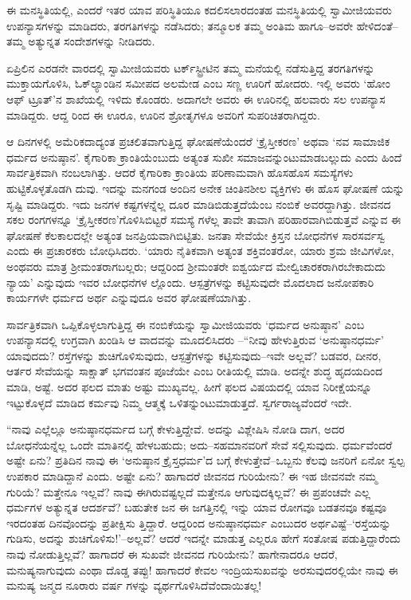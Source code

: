 ಈ ಮನಸ್ಥಿತಿಯಲ್ಲಿ, ಎಂದರೆ ಇತರ ಯಾವ ಪರಿಸ್ಥಿತಿಯೂ ಕದಲಿಸಲಾರದಂತಹ ಮನಸ್ಥಿತಿಯಲ್ಲಿ ಸ್ವಾಮೀಜಿಯವರು ಉಪನ್ಯಾಸಗಳನ್ನು ಮಾಡಿದರು, ತರಗತಿಗಳನ್ನು ನಡೆಸಿದರು; ತನ್ಮೂಲಕ ತಮ್ಮ ಅಂತಿಮ ಹಾಗೂ–ಅವರೇ ಹೇಳಿದಂತೆ–ತಮ್ಮ ಅತ್ಯುನ್ನತ ಸಂದೇಶಗಳನ್ನು ನೀಡಿದರು.

ಏಪ್ರಿಲಿನ ಎರಡನೇ ವಾರದಲ್ಲಿ ಸ್ವಾಮೀಜಿಯವರು ಟರ್ಕ್​ಸ್ಟ್ರೀಟಿನ ತಮ್ಮ ಮನೆಯಲ್ಲಿ ನಡೆಸುತ್ತಿದ್ದ ತರಗತಿಗಳನ್ನು ಮುಕ್ತಾಯಗೊಳಿಸಿ, ಓಕ್​ಲ್ಯಾಂಡಿನ ಸಮೀಪದ ಅಲಮೇಡ ಎಂಬ ಸಣ್ಣ ಊರಿಗೆ ಹೋದರು. ಇಲ್ಲಿ ಅವರು ‘ಹೋಂ ಆಫ್ ಟ್ರೂತ್​’ನ ಶಾಖೆಯಲ್ಲಿ ಇಳಿದು ಕೊಂಡರು. ಅದಾಗಲೇ ಅವರು ಈ ಊರಿನಲ್ಲಿ ಹಲವಾರು ಸಲ ಉಪನ್ಯಾಸ ಮಾಡಿದ್ದರು. ಆದ್ದ ರಿಂದ ಈ ಊರೂ, ಊರಿನ ಶ್ರೋತೃಗಳೂ ಅವರಿಗೆ ಸುಪರಿಚಿತರಾಗಿದ್ದರು.

ಆ ದಿನಗಳಲ್ಲಿ ಅಮೆರಿಕದಾದ್ಯಂತ ಪ್ರಚಲಿತವಾಗುತ್ತಿದ್ದ ಘೋಷಣೆಯೆಂದರೆ ‘ಕ್ರೈಸ್ತೀಕರಣ’ ಅಥವಾ ‘ನವ ಸಾಮಾಜಿಕ ಧರ್ಮದ ಅನುಷ್ಠಾನ’. ಕೈಗಾರಿಕಾ ಕ್ರಾಂತಿಯೆಂಬುದು ಅತ್ಯಂತ ಸುಖೀ ಸಮಾಜವನ್ನುಂಟುಮಾಡಬಲ್ಲುದು ಎಂದು ಹಿಂದೆ ಸಾರ್ವತ್ರಿಕವಾಗಿ ನಂಬಲಾಗಿತ್ತು. ಆದರೆ ಕೈಗಾರಿಕಾ ಕ್ರಾಂತಿಯ ಪರಿಣಾಮವಾಗಿ ಹೊಸಹೊಸ ಸಮಸ್ಯೆಗಳು ಹುಟ್ಟಿಕೊಳ್ಳತೊಡಗಿ ದುವು. ಇದನ್ನು ಮನಗಂಡ ಅಂದಿನ ಅನೇಕ ಚಿಂತಿನಶೀಲ ವ್ಯಕ್ತಿಗಳು ಈ ಹೊಸ ಘೋಷಣೆ ಯನ್ನು ಸೃಷ್ಟಿ ಮಾಡಿದ್ದರು. ಇದು ಜನಗಳ ಕಷ್ಟಗಳನ್ನೆಲ್ಲ ದೂರ ಮಾಡಿಬಿಡುತ್ತದೆಯೆಂಬ ನಂಬಿಕೆ ಅವರದ್ದಾಗಿತ್ತು. ಜೀವನದ ಸಕಲ ರಂಗಗಳನ್ನೂ ‘ಕ್ರೈಸ್ತೀಕರಣ’ಗೊಳಿಸಿಬಿಟ್ಟರೆ ಸಮಸ್ಯೆ ಗಳೆಲ್ಲ ತಾವೇ ತಾವಾಗಿ ಪರಿಹಾರವಾಗಿಬಿಡುತ್ತವೆ ಎನ್ನುವ ಈ ಘೋಷಣೆ ಕೆಲಕಾಲದಲ್ಲೇ ಅತ್ಯಂತ ಜನಪ್ರಿಯವಾಗಿಬಿಟ್ಟಿತು. ಜನತಾ ಸೇವೆಯೇ ಕ್ರಿಸ್ತನ ಬೋಧನೆಗಳ ಸಾರಸರ್ವಸ್ವ ಎಂದು ಈ ಪ್ರಚಾರಕರು ಬೋಧಿಸಿದರು. ‘ಯಾರು ನೈತಿಕವಾಗಿ ಅತ್ಯಂತ ಶಕ್ತಿವಂತರೋ, ಯಾರು ಶ್ರಮ ಜೀವಿಗಳೋ, ಅಂಥವರು ಮಾತ್ರ ಶ್ರೀಮಂತರಾಗಬಲ್ಲರು; ಆದ್ದರಿಂದ ಶ್ರೀಮಂತರೇ ಐಶ್ವರ್ಯದ ಮೇಲ್ವಿಚಾರಕರಾಗಿರಬೇಕಾದುದು ನ್ಯಾಯ’ ಎನ್ನುವುದು ಇವರ ಬೋಧನೆಗಳ ಲ್ಲೊಂದು. ಆಸ್ಪತ್ರೆಗಳನ್ನು ಕಟ್ಟಿಸುವುದೇ ಮೊದಲಾದ ಜನೋಪಕಾರಿ ಕಾರ್ಯಗಳೇ ಧರ್ಮದ ಅರ್ಥ ಎನ್ನುವುದೂ ಅವರ ಘೋಷಣೆಯಾಗಿತ್ತು.

ಸಾರ್ವತ್ರಿಕವಾಗಿ ಒಪ್ಪಿಕೊಳ್ಳಲಾಗುತ್ತಿದ್ದ ಈ ನಂಬಿಕೆಯನ್ನು ಸ್ವಾಮೀಜಿಯವರು ‘ಧರ್ಮದ ಅನುಷ್ಠಾನ’ ಎಂಬ ಉಪನ್ಯಾಸದಲ್ಲಿ ಉಗ್ರವಾಗಿ ಖಂಡಿಸಿ ಆ ವಾದವನ್ನು ಮೂದಲಿಸಿದರು –“ನೀವು ಹೇಳುತ್ತಿರುವ ‘ಅನುಷ್ಠಾನಧರ್ಮ’ ಯಾವುದದು? ರಸ್ತೆಗಳನ್ನು ಶುಚಿಗೊಳಿಸುವುದು, ಆಸ್ಪತ್ರೆಗಳನ್ನು ಕಟ್ಟಿಸುವುದು–ಇವೇ ಅಲ್ಲವೆ? ಬಡವರ, ದೀನರ, ಆರ್ತರ ಸೇವೆಯನ್ನು ಸಾಕ್ಷಾತ್ ಭಗವಂತನ ಪೂಜೆಯೇ ಎಂಬ ರೀತಿಯಲ್ಲಿ ಮಾಡಿ. ಅದನ್ನೇ ಶುದ್ಧ ಹೃದಯದಿಂದ ಮಾಡಿ, ಅಷ್ಟೆ. ಅದರ ಫಲದ ಮಾತು ಅಷ್ಟು ಮುಖ್ಯವಲ್ಲ. ಹೀಗೆ ಫಲದ ವಿಷಯದಲ್ಲಿ ಯಾವ ನಿರೀಕ್ಷೆಯನ್ನೂ ಇಟ್ಟುಕೊಳ್ಳದೆ ಮಾಡಿದ ಕರ್ಮವು ನಿಮ್ಮ ಆತ್ಮಕ್ಕೆ ಒಳಿತನ್ನುಂಟುಮಾಡುತ್ತದೆ. ಸ್ವರ್ಗರಾಜ್ಯವೆಂದರೆ ಇದೇ.

“ನಾವು ಎಲ್ಲೆಲ್ಲೂ ಅನುಷ್ಠಾನಧರ್ಮದ ಬಗ್ಗೆ ಕೇಳುತ್ತಿದ್ದೇವೆ. ಅದನ್ನು ವಿಶ್ಲೇಷಿಸಿ ನೋಡಿ ದಾಗ, ಅದರ ಬೋಧನೆಯನ್ನೆಲ್ಲ ಒಂದೇ ಮಾತಿನಲ್ಲಿ ಹೇಳಬಹುದು; ಅದು–ಸಹಮಾನವರಿಗೆ ಸೇವೆ ಸಲ್ಲಿಸುವುದು. ಧರ್ಮವೆಂದರೆ ಅಷ್ಟೇ ಏನು? ಪ್ರತಿದಿನ ನಾವು ಈ ‘ಅನುಷ್ಠಾನ ಕ್ರೈಸ್ತಧರ್ಮ’ದ ಬಗ್ಗೆ ಕೇಳುತ್ತೇವೆ–ಒಬ್ಬನು ಕೆಲವು ಜನರಿಗೆ ಏನೋ ಸ್ವಲ್ಪ ಉಪಕಾರ ಮಾಡಿದ್ದಾನೆ ಎಂದು. ಅಷ್ಟೇ ಏನು? ಹಾಗಾದರೆ ಜೀವನದ ಗುರಿಯೇನು? ಈ ಇಹ ಜೀವನವೇ ನಮ್ಮ ಗುರಿಯೆ? ಮತ್ತೇನೂ ಇಲ್ಲವೆ? ನಾವು ಈಗಿರುವಷ್ಟಲ್ಲದೆ ಮತ್ತೇನೂ ಆಗುವುದಕ್ಕಿಲ್ಲವೆ? ಈ ಪ್ರಪಂಚವೇ ಎಲ್ಲ ಧರ್ಮಗಳ ಅತ್ಯುನ್ನತ ಆದರ್ಶವೆ? ಬಹುತೇಕ ಜನ ಈ ಜಗತ್ತಿನಲ್ಲಿ ಇನ್ನು ಯಾವ ರೋಗವೂ ಬಡತನವೂ ಕಷ್ಟವೂ ಇರದಂತಹ ದಿನವೊಂದನ್ನು ಪ್ರತೀಕ್ಷಿಸು ತ್ತಿದ್ದಾರೆ. ಆದ್ದರಿಂದ ಅನುಷ್ಠಾನಧರ್ಮ ಎಂಬುದರ ಅರ್ಥವಿಷ್ಟೆ–‘ರಸ್ತೆಯನ್ನು ಗುಡಿಸು, ಅದನ್ನು ಶುಚಿಗೊಳಿಸು!’–ಅಲ್ಲವೆ? ಆದರೆ ಇದನ್ನೇ ಮಾಡುತ್ತ ಎಲ್ಲರೂ ಹೇಗೆ ಸಂತೋಷ ಪಡುತ್ತಿದ್ದಾರೆಂದು ನಾವು ನೋಡುತ್ತಿಲ್ಲವೆ? ಹಾಗಾದರೆ ಈ ಸುಖವೇ ಜೀವನದ ಗುರಿಯೇನು? ಹಾಗೇನಾದರೂ ಆದರೆ, ಮನುಷ್ಯನಾಗುವುದು ಎಂಥಾ ದೊಡ್ಡ ತಪ್ಪು! ಹಾಗಾದರೆ ಕೇವಲ ಇಂದ್ರಿಯಸುಖವನ್ನು ಅರಸುವುದರಲ್ಲಿಯೇ ನಾವು ಈ ಮನುಷ್ಯ ಜನ್ಮದ ನೂರಾರು ವರ್ಷ ಗಳನ್ನು ವ್ಯರ್ಥಗೊಳಿಸಿದೆವೆಂದಾಯಿತಲ್ಲ!

